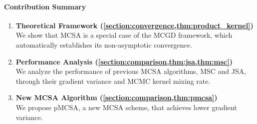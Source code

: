 \vspace{-0.1in}
\paragraph{Contribution Summary}
\setlength\itemsep{0.01in}
\begin{enumerate}[leftmargin=5mm,listparindent=\parindent]
\vspace{-0.05in}
\item \textbf{Theoretical Framework (\cref{section:convergence,thm:product_kernel})} \\
  We show that MCSA is a special case of the MCGD framework, which automatically establishes its non-asymptotic convergence.
\item \textbf{Performance Analysis (\cref{section:comparison,thm:jsa,thm:msc})} \\
  We analyze the performance of previous MCSA algorithms, MSC and JSA, through their gradient variance and MCMC kernel mixing rate.
\item \textbf{New MCSA Algorithm (\cref{section:comparison,thm:pmcsa})} \\
  We propose pMCSA, a new MCSA scheme, that achieves lower gradient variance.
\end{enumerate}

